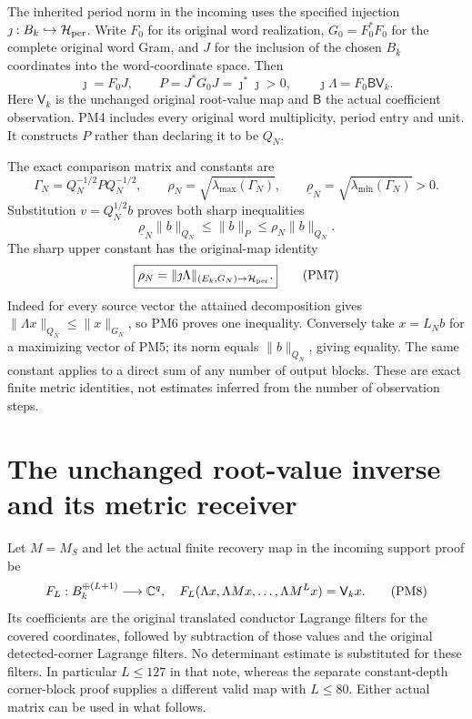 \documentclass[11pt]{article}
\begin{document}
The inherited period norm in the incoming
uses the specified injection $\jmath:B_k\hookrightarrow\mathcal H_{\rm per}$.
Write $F_0$ for its original word realization, $G_0=F_0^*F_0$ for
the complete original word Gram, and $J$ for the inclusion of
the chosen $B_k$ coordinates into the word-coordinate space.
Then
\[
 \jmath=F_0J,\qquad P=J^*G_0J=\jmath^*\jmath>0,
 \qquad\jmath\Lambda=F_0\mathsf B\mathsf V_k.                   \tag{PM4}
\]
Here $\mathsf V_k$ is the unchanged original root-value map and
$\mathsf B$ the actual coefficient observation.  PM4 includes
every original word multiplicity, period entry and unit.  It
constructs $P$ rather than declaring it to be $Q_N$.

The exact comparison matrix and constants are
\[
 \Gamma_N=Q_N^{-1/2}P Q_N^{-1/2},\qquad
 \rho_N=\sqrt{\lambda_{\max}(\Gamma_N)},\qquad
 \underline\rho_N=\sqrt{\lambda_{\min}(\Gamma_N)}>0.             \tag{PM5}
\]
Substitution $v=Q_N^{1/2}b$ proves both sharp inequalities
\[
 \underline\rho_N\|b\|_{Q_N}\le\|b\|_P
                         \le\rho_N\|b\|_{Q_N}.                 \tag{PM6}
\]
The sharp upper constant has the original-map identity
\[
 \boxed{\rho_N=\|\jmath\Lambda\|_{(E_k,G_N)\to\mathcal H_{\rm per}}.}
                                                                    \tag{PM7}
\]
Indeed for every source vector the attained decomposition gives
$\|\Lambda x\|_{Q_N}\le\|x\|_{G_N}$, so PM6 proves one
inequality.  Conversely take $x=L_Nb$ for a maximizing vector of
PM5; its norm equals $\|b\|_{Q_N}$, giving equality.  The same
constant applies to a direct sum of any number of output blocks.
These are exact finite metric identities, not estimates inferred
from the number of observation steps.

\section{The unchanged root-value inverse and its metric receiver}
Let $M=M_S$ and let the actual finite recovery map in the incoming
support proof be
\[
 F_L:B_k^{\oplus(L+1)}\longrightarrow\mathbb C^q,
 \quad F_L(\Lambda x,\Lambda Mx,\ldots,\Lambda M^Lx)
                                  =\mathsf V_kx.               \tag{PM8}
\]
Its coefficients are the original translated conductor Lagrange
filters for the covered coordinates, followed by subtraction of
those values and the original detected-corner Lagrange filters.
No determinant estimate is substituted for these filters.
In particular $L\le127$ in that note, whereas the separate
constant-depth corner-block proof supplies a different valid map
with $L\le80$.  Either actual matrix can be used in what follows.
\end{document}
